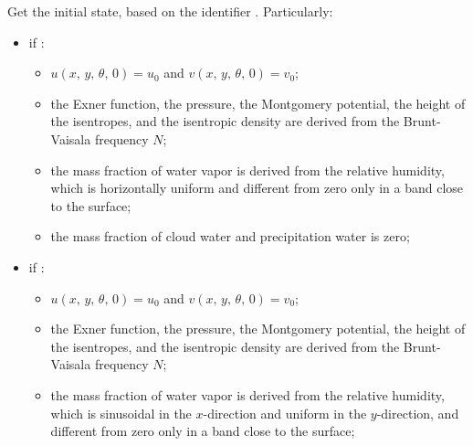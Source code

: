 \documentclass[letterpaper,10pt,english]{sphinxmanual}
\begin{document}
\begin{fulllineitems}
\begin{fulllineitems}
\end{fulllineitems}


\begin{fulllineitems}
\label{\detokenize{api:tasmania.dycore.dycore_isentropic_nonconservative.DynamicalCoreIsentropicNonconservative.get_initial_state}}
Get the initial state, based on the identifier . Particularly:
\begin{itemize}
\item {} 
if :
\begin{itemize}
\item {} 
\(u(x, \, y, \, \theta, \, 0) = u_0\) and \(v(x, \, y, \, \theta, \, 0) = v_0\);

\item {} 
the Exner function, the pressure, the Montgomery potential, the height of the isentropes,                             and the isentropic density are derived from the Brunt-Vaisala frequency \(N\);

\item {} 
the mass fraction of water vapor is derived from the relative humidity, which is horizontally uniform                                 and different from zero only in a band close to the surface;

\item {} 
the mass fraction of cloud water and precipitation water is zero;

\end{itemize}

\item {} 
if :
\begin{itemize}
\item {} 
\(u(x, \, y, \, \theta, \, 0) = u_0\) and \(v(x, \, y, \, \theta, \, 0) = v_0\);

\item {} 
the Exner function, the pressure, the Montgomery potential, the height of the isentropes,                             and the isentropic density are derived from the Brunt-Vaisala frequency \(N\);

\item {} 
the mass fraction of water vapor is derived from the relative humidity, which is sinusoidal in the                            \(x\)-direction and uniform in the \(y\)-direction, and different from zero only in a band                              close to the surface;


\end{itemize}
\end{itemize}
\end{fulllineitems}
\end{fulllineitems}
\end{document}
